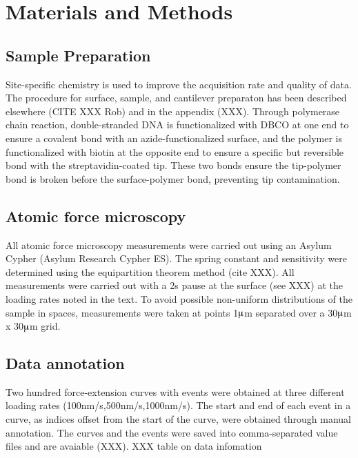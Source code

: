 \documentclass[%
  aip,12pt,tightenlines,
  amsthm,
 amsmath,amssymb
]{article}
\newcommand{\sLabel}[1]{\label{section:#1}}
\newcommand{\supply}[2]{(#1 #2)}
\begin{document}
\section{\sLabel{Materials}Materials and Methods}

\subsection{Sample Preparation}

Site-specific chemistry is used to improve the acquisition rate and quality of data. The procedure for surface, sample, and cantilever preparaton has been described elsewhere (CITE XXX Rob) and in the appendix (XXX). Through polymerase chain reaction, double-stranded DNA is functionalized with DBCO at one end to ensure a covalent bond with an azide-functionalized surface, and the polymer is functionalized with biotin at the opposite end to ensure a specific but reversible bond with the streptavidin-coated tip. These two bonds ensure the tip-polymer bond is broken before the surface-polymer bond, preventing tip contamination.

\subsection{\sLabel{Surface}Atomic force microscopy}

All atomic force microscopy measurements were carried out using an Asylum Cypher \supply{Asylum Research}{Cypher ES}. The spring constant and sensitivity were determined using the equipartition theorem method (cite XXX). All measurements were carried out with a 2s pause at the surface (see XXX) at the loading rates noted in the text. To avoid possible non-uniform distributions of the sample in spaces, measurements were taken at points 1$\muup$m separated over a 30$\muup$m x 30$\muup$m grid. 

\subsection{\sLabel{Annotation}Data annotation}

Two hundred force-extension curves with events were obtained at three different loading rates (100nm/s,500nm/s,1000nm/s). The start and end of each event in a curve, as indices offset from the start of the curve, were obtained through manual annotation. The curves and the events were saved into comma-separated value files and are avaiable (XXX). XXX table on data infomation
\end{document}
